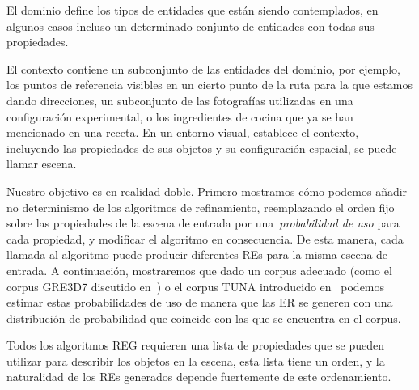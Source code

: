 El dominio define los tipos de entidades que est\'an siendo contemplados, en algunos
casos incluso un determinado conjunto de entidades con todas sus propiedades.

El contexto contiene un subconjunto de las entidades del dominio, por ejemplo, los puntos de referencia visibles en un cierto punto de la ruta para la que estamos dando direcciones, un
subconjunto de las fotograf\'ias utilizadas en una configuraci\'on experimental, o los ingredientes de cocina que ya se han mencionado en una receta. En un entorno visual, establece el contexto, incluyendo las
propiedades de sus objetos y su configuraci\'on espacial, se puede llamar escena. 



Nuestro objetivo es en realidad doble. Primero mostramos c\'omo podemos a\~nadir no determinismo de los algoritmos de refinamiento, reemplazando el orden fijo
sobre las propiedades de la escena de entrada por una~\emph{probabilidad de uso} para cada propiedad, y modificar el algoritmo en consecuencia.
De esta manera, cada llamada al algoritmo puede producir diferentes REs para la misma escena de entrada. A continuaci\'on, mostraremos que dado un corpus adecuado (como el corpus GRE3D7 discutido en~\cite{viet:gene11}) o el corpus TUNA introducido en~\cite{gatt-balz-kow:2008:ENLG} podemos estimar estas probabilidades de uso de manera que las ER se generen con una distribuci\'on de probabilidad que coincide con las que se encuentra en el corpus.

Todos los algoritmos REG requieren una lista de propiedades que se pueden utilizar para describir los objetos en la escena, esta lista tiene un orden, y la naturalidad de los REs generados depende fuertemente de este ordenamiento.


